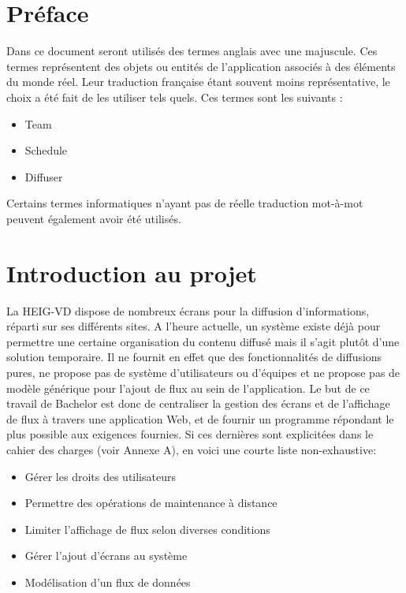 \documentclass[french]{article}
\begin{document}
\maketitle

\tableofcontents
\newpage
\listoffigures
\newpage
\lstlistoflistings

\newpage

\section{Préface}

Dans ce document seront utilisés des termes anglais avec une majuscule. Ces termes représentent des objets ou entités de l'application associés à des éléments du monde réel. Leur traduction française étant souvent moins représentative, le choix a été fait de les utiliser tels quels. Ces termes sont les suivants :
\begin{itemize}
	\item Team
	\item Schedule
	\item Diffuser
\end{itemize}
Certains termes informatiques n'ayant pas de réelle traduction mot-à-mot peuvent également avoir été utilisés.


\newpage

\section{Introduction au projet}

La HEIG-VD dispose de nombreux écrans pour la diffusion d'informations, réparti sur ses différents sites. A l'heure actuelle, un système existe déjà pour permettre une certaine organisation du contenu diffusé mais il s'agit plutôt d'une solution temporaire. Il ne fournit en effet que des fonctionnalités de diffusions pures, ne propose pas de système d'utilisateurs ou d'équipes et ne propose pas de modèle générique pour l'ajout de flux au sein de l'application. \newline
Le but de ce travail de Bachelor est donc de centraliser la gestion des écrans et de l'affichage de flux à travers une application Web, et de fournir un programme répondant le plus possible aux exigences fournies. Si ces dernières sont explicitées dans le cahier des charges (voir Annexe A), en voici une courte liste non-exhaustive:
\begin{itemize}
	\item Gérer les droits des utilisateurs
	\item Permettre des opérations de maintenance à distance
	\item Limiter l'affichage de flux selon diverses conditions
	\item Gérer l'ajout d'écrans au système 
	\item Modélisation d'un flux de données \newline
\end{itemize}
\end{document}
